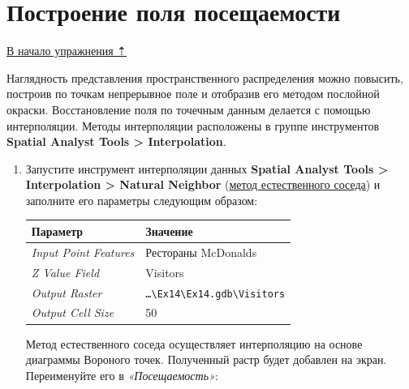 \documentclass[]{book}
\theoremstyle{definition}
\theoremstyle{definition}
\theoremstyle{definition}
\theoremstyle{remark}
\begin{document}
\hypertarget{geocoding-field}{%
\section{Построение поля посещаемости}\label{geocoding-field}}

\protect\hyperlink{geocoding}{В начало упражнения ⇡}

Наглядность представления пространственного распределения можно
повысить, построив по точкам непрерывное поле и отобразив его методом
послойной окраски. Восстановление поля по точечным данным делается с
помощью интерполяции. Методы интерполяции расположены в группе
инструментов \textbf{Spatial Analyst Tools \textgreater{}
Interpolation}.

\begin{enumerate}
\def\labelenumi{\arabic{enumi}.}
\item
  Запустите инструмент интерполяции данных \textbf{Spatial Analyst Tools
  \textgreater{} Interpolation \textgreater{} Natural Neighbor}
  (\href{http://desktop.arcgis.com/ru/arcmap/10.3/tools/spatial-analyst-toolbox/natural-neighbor.htm}{метод
  естественного соседа}) и заполните его параметры следующим образом:

  \begin{longtable}[]{@{}ll@{}}
  \toprule
  Параметр & Значение\tabularnewline
  \midrule
  \endhead
  \emph{Input Point Features} & Рестораны McDonalds\tabularnewline
  \emph{Z Value Field} & Visitors\tabularnewline
  \emph{Output Raster} &
  \texttt{\ldots{}\textbackslash{}Ex14\textbackslash{}Ex14.gdb\textbackslash{}Visitors}\tabularnewline
  \emph{Output Cell Size} & 50\tabularnewline
  \bottomrule
  \end{longtable}

  Метод естественного соседа осуществляет интерполяцию на основе
  диаграммы Вороного точек. Полученный растр будет добавлен на экран.
  Переименуйте его в \emph{«Посещаемость»}:


\end{enumerate}
\end{document}
